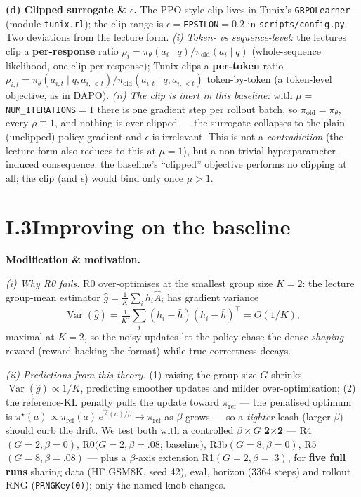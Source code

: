 \documentclass[11pt]{article}
\newcommand{\code}[1]{\texttt{#1}}
\begin{document}
\textbf{(d) Clipped surrogate \& $\epsilon$.} The PPO-style clip lives in Tunix's \code{GRPOLearner} (module \code{tunix.rl}); the clip range is
$\epsilon{=}$\code{EPSILON}$=0.2$ in \code{scripts/config.py}. Two deviations from the lecture form. \emph{(i) Token- vs sequence-level:} the
lectures clip a \textbf{per-response} ratio $\rho_i{=}\pi_\theta(a_i\mid q)/\pi_{\mathrm{old}}(a_i\mid q)$ (whole-sequence likelihood, one clip
per response); Tunix clips a \textbf{per-token} ratio $\rho_{i,t}{=}\pi_\theta(a_{i,t}\mid q,a_{i,<t})/\pi_{\mathrm{old}}(a_{i,t}\mid q,a_{i,<t})$
token-by-token (a token-level objective, as in DAPO). \emph{(ii) The clip is inert in this baseline:} with $\mu{=}$\code{NUM\_ITERATIONS}$=1$
there is one gradient step per rollout batch, so $\pi_{\mathrm{old}}{=}\pi_\theta$, every $\rho\equiv1$, and nothing is ever clipped --- the
surrogate collapses to the plain (unclipped) policy gradient and $\epsilon$ is irrelevant. This is not a \emph{contradiction} (the lecture form
also reduces to this at $\mu{=}1$), but a non-trivial hyperparameter-induced consequence: the baseline's ``clipped'' objective performs no
clipping at all; the clip (and $\epsilon$) would bind only once $\mu>1$.

\section*{I.3\quad Improving on the baseline}
\textbf{Modification \& motivation.}

\emph{(i) Why R0 fails.} R0 over-optimises at the smallest group size $K{=}2$: the lecture group-mean estimator $\hat g=\tfrac1K\sum_i h_i\hat A_i$
has gradient variance
\[
  \operatorname{Var}(\hat g)=\tfrac1{K^2}\textstyle\sum_{i}(h_i-\bar h)(h_i-\bar h)^\top=O(1/K),
\]
maximal at $K{=}2$, so the noisy updates let the policy chase the dense \emph{shaping} reward (reward-hacking the format) while true correctness decays.

\emph{(ii) Predictions from this theory.} (1) raising the group size $G$ shrinks $\operatorname{Var}(\hat g)\propto1/K$, predicting smoother updates and
milder over-optimisation; (2) the reference-KL penalty pulls the update toward $\pi_{\mathrm{ref}}$ --- the penalised optimum is
$\pi^\star(a)\propto\pi_{\mathrm{ref}}(a)\,e^{\hat A(a)/\beta}\!\to\!\pi_{\mathrm{ref}}$ as $\beta$ grows --- so a \emph{tighter} leash (larger $\beta$)
should curb the drift. We test both with a controlled $\beta\times G$ \textbf{2$\times$2} --- R4$(G{=}2,\beta{=}0)$, R0$(G{=}2,\beta{=}.08$; baseline$)$,
R3b$(G{=}8,\beta{=}0)$, R5$(G{=}8,\beta{=}.08)$ --- plus a $\beta$-axis extension R1$(G{=}2,\beta{=}.3)$, for \textbf{five full runs} sharing data
(HF GSM8K, seed 42), eval, horizon (3364 steps) and rollout RNG (\code{PRNGKey(0)}); only the named knob changes.
\end{document}
